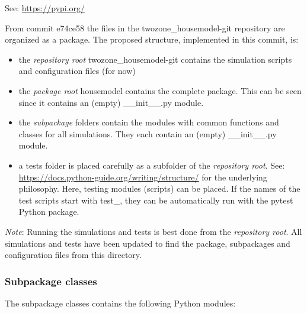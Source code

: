 See: \url{https://pypi.org/}

From commit \textsf{e74ce58} the files in the \textsf{twozone\_housemodel-git} repository are organized as a package. The proposed structure, implemented in this commit, is:


\begin{itemize}
	\item the \emph{repository root} \textsf{twozone\_housemodel-git} contains the simulation scripts and configuration files (for now) 
	\item the \emph{package root} \textsf{housemodel} contains the complete package. This can be seen since it contains an (empty) \textsf{\_\_init\_\_.py} module.
	\item the \emph{subpackage} folders contain the modules with common functions and classes for all simulations. They each contain an (empty) \textsf{\_\_init\_\_.py} module.
	\item a \textsf{tests} folder is placed carefully as a subfolder of the \emph{repository root}. 
	See: \url{https://docs.python-guide.org/writing/structure/} for the underlying philosophy. Here, testing modules (scripts) can be placed. If the names of the test scripts start with \textsf{test\_}, they can be automatically run with the \textsf{pytest} Python package.
\end{itemize}

\textit{Note}: Running the simulations and tests is best done from the \emph{repository root}. All simulations and tests have been updated to find the package, subpackages and configuration files from this directory.

\subsubsection{Subpackage \textsf{classes}}
 The subpackage \textsf{classes} contains the following Python modules:

